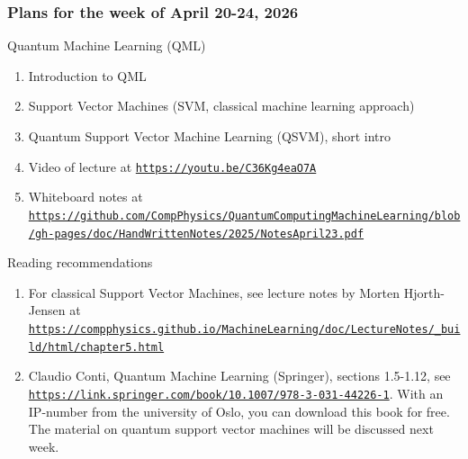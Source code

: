 \documentclass{beamer}
\begin{document}
\begin{frame}
\frametitle{Plans for the week of April 20-24, 2026}

\begin{block}{Quantum Machine Learning (QML) }
\begin{enumerate}
 \item Introduction to QML

 \item Support Vector Machines (SVM, classical machine learning approach)

 \item Quantum Support Vector Machine Learning (QSVM), short intro

 \item Video of lecture at \href{{https://youtu.be/C36Kg4eaO7A}}{\nolinkurl{https://youtu.be/C36Kg4eaO7A}}

 \item Whiteboard notes at \href{{https://github.com/CompPhysics/QuantumComputingMachineLearning/blob/gh-pages/doc/HandWrittenNotes/2025/NotesApril23.pdf}}{\nolinkurl{https://github.com/CompPhysics/QuantumComputingMachineLearning/blob/gh-pages/doc/HandWrittenNotes/2025/NotesApril23.pdf}}  
\end{enumerate}

\noindent
\end{block}

\begin{block}{Reading recommendations }
\begin{enumerate}
\item For classical Support Vector Machines, see lecture notes by Morten Hjorth-Jensen at \href{{https://compphysics.github.io/MachineLearning/doc/LectureNotes/_build/html/chapter5.html}}{\nolinkurl{https://compphysics.github.io/MachineLearning/doc/LectureNotes/_build/html/chapter5.html}}

\item Claudio Conti, Quantum Machine Learning (Springer), sections 1.5-1.12, see \href{{https://link.springer.com/book/10.1007/978-3-031-44226-1}}{\nolinkurl{https://link.springer.com/book/10.1007/978-3-031-44226-1}}. With an IP-number from the university of Oslo, you can download this book for free. The material on quantum support vector machines will be discussed next week.
\end{enumerate}

\noindent
\end{block}
\end{frame}
\end{document}
